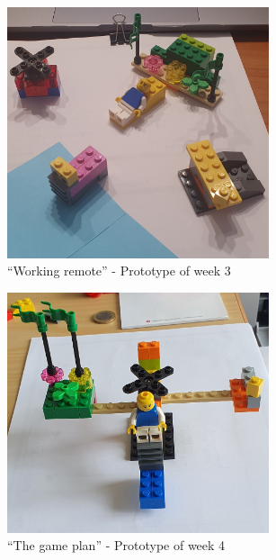\begin{center}
    \begin{figure}[h]
        \begin{center}
            \includegraphics[width=7.7cm]{img/week_3_1.jpg}
        \end{center}
        \caption{``Working remote'' - Prototype of week 3}
        \label{fig:week3}
    \end{figure} 
    \vspace{2 cm}
    \begin{figure}[h]
        \begin{center}
            \includegraphics[width=7.7cm]{img/week_4.jpg}
        \end{center}
        \caption{``The game plan'' - Prototype of week 4}
        \label{fig:week4}
    \end{figure} 
\end{center}


\pagebreak